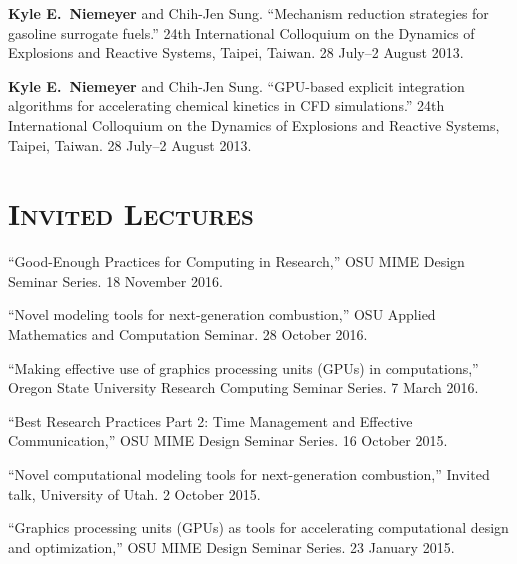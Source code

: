 \documentclass[margin,line,11pt]{res}
\makeatletter
\newlength{\bibhang}
\newlength{\bibsep}
 {\@listi \global\bibsep\itemsep \global\advance\bibsep by\parsep}
\newenvironment{bibenum*}
  {\renewcommand\labelenumi{\theenumi.}%
   \etaremune[
     topsep=0pt,
     itemsep=\bibsep,
     parsep=0pt,partopsep=0pt,
     itemindent=-\bibhang,
     leftmargin={\bibhang+\widthof{[999]}}]}
  {\endetaremune}
\makeatother
\begin{document}
\begin{resume}
\begin{bibenum*}
\item \textbf{Kyle E.\ Niemeyer} and Chih-Jen Sung.
``Mechanism reduction strategies for gasoline surrogate fuels.''
24th International Colloquium on the Dynamics of Explosions and Reactive Systems, Taipei, Taiwan.
28 July--2 August 2013.

\item \textbf{Kyle E.\ Niemeyer} and Chih-Jen Sung.
``GPU-based explicit integration algorithms for accelerating chemical kinetics in CFD simulations.''
24th International Colloquium on the Dynamics of Explosions and Reactive Systems, Taipei, Taiwan.
28 July--2 August 2013.

\end{bibenum*}

\section{\textsc{Invited Lectures}}

\begin{bibenum*}
\item ``Good-Enough Practices for Computing in Research,''
OSU MIME Design Seminar Series. 18 November 2016.

\item ``Novel modeling tools for next-generation combustion,''
OSU Applied Mathematics and Computation Seminar. 28 October 2016.

\item ``Making effective use of graphics processing units (GPUs) in computations,''
Oregon State University Research Computing Seminar Series. 7 March 2016.

\item ``Best Research Practices Part 2: Time Management and Effective Communication,''
OSU MIME Design Seminar Series. 16 October 2015.

\item ``Novel computational modeling tools for next-generation combustion,''
Invited talk, University of Utah. 2 October 2015.

\item ``Graphics processing units (GPUs) as tools for accelerating computational design and optimization,''
OSU MIME Design Seminar Series. 23 January 2015.

\end{bibenum*}


\end{resume}
\end{document}
